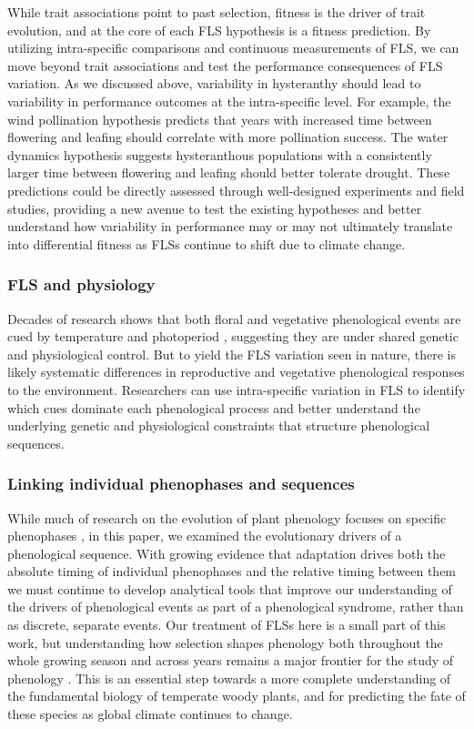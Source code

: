 \documentclass[11pt]{article}
\begin{document}
\noindent While trait associations point to past selection, fitness is the driver of trait evolution, and at the core of each FLS hypothesis is a fitness prediction. By utilizing intra-specific comparisons and continuous measurements of FLS, we can move beyond trait associations and test the performance consequences of FLS variation. As we discussed above, variability in hysteranthy should lead to variability in performance outcomes at the intra-specific level. For example, the wind pollination hypothesis predicts that years with increased time between flowering and leafing should correlate with more pollination success. The water dynamics hypothesis suggests hysteranthous populations with a consistently larger time between flowering and leafing should better tolerate drought. These predictions could be directly assessed through well-designed experiments and field studies, providing a new avenue to test the existing hypotheses and better understand how variability in performance may or may not ultimately translate into differential fitness as FLSs continue to shift due to climate change.

\subsubsection*{FLS and physiology} 
\noindent Decades of research shows that both floral and vegetative phenological events are cued by temperature and photoperiod \citep{Forrest2010}, suggesting they are under shared genetic and physiological control. But to yield the FLS variation seen in nature, there is likely systematic differences in reproductive and vegetative phenological responses to the environment. Researchers can use intra-specific variation in FLS to identify which cues dominate each phenological process and better understand the underlying genetic and physiological constraints that structure phenological sequences.

\subsubsection*{Linking individual phenophases and sequences}
\noindent While much of research on the evolution of plant phenology focuses on specific phenophases  \citep[e.g.][]{Savage2013,OLLERTON_1992}, in this paper, we examined the evolutionary drivers of a phenological sequence. With growing evidence that adaptation drives both the absolute timing of individual phenophases and the relative timing between them we must continue to develop analytical tools that improve our understanding of the drivers of phenological events as part of a phenological syndrome, rather than as discrete, separate events. 
Our treatment of FLSs here is a small part of this work, but understanding how selection shapes phenology both throughout the whole growing season and across years remains a major frontier for the study of phenology \citep{Wolkovich2014b}. This is an essential step towards a more complete understanding of the fundamental biology of temperate woody plants, and for predicting the fate of these species as global climate continues to change.
\end{document}
